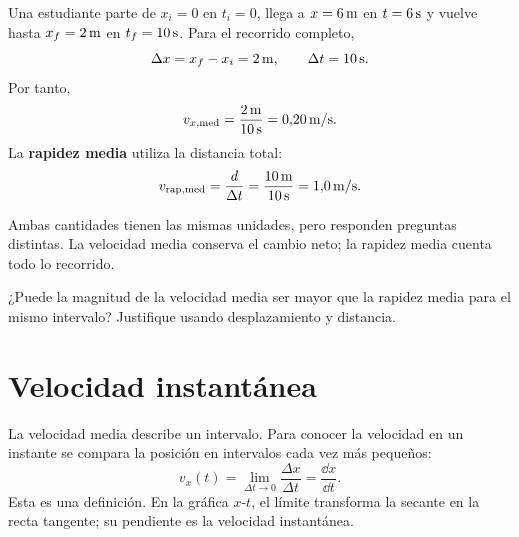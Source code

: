 \documentclass[11pt]{article}
\begin{document}
Una estudiante parte de \(x_i=0\) en \(t_i=0\), llega a
\(x=6\,\mathrm{m}\) en \(t=6\,\mathrm{s}\) y vuelve hasta
\(x_f=2\,\mathrm{m}\) en \(t_f=10\,\mathrm{s}\). Para el recorrido completo,
\[
  \Delta x=x_f-x_i=2\,\mathrm{m},
  \qquad
  \Delta t=10\,\mathrm{s}.
\]
Por tanto,
\[
  v_{x,\mathrm{med}}
  =
  \frac{2\,\mathrm{m}}{10\,\mathrm{s}}
  =
  0{,}20\,\mathrm{m/s}.
\]
La \textbf{rapidez media} utiliza la distancia total:
\[
  v_{\mathrm{rap,med}}
  =
  \frac{d}{\Delta t}
  =
  \frac{10\,\mathrm{m}}{10\,\mathrm{s}}
  =
  1{,}0\,\mathrm{m/s}.
\]


Ambas cantidades tienen las mismas unidades, pero responden preguntas
distintas. La velocidad media conserva el cambio neto; la rapidez media cuenta
todo lo recorrido.

\begin{pregunta}
¿Puede la magnitud de la velocidad media ser mayor que la rapidez media para el
mismo intervalo? Justifique usando desplazamiento y distancia.
\end{pregunta}

\section{Velocidad instantánea}

La velocidad media describe un intervalo. Para conocer la velocidad en un
instante se compara la posición en intervalos cada vez más pequeños:
\[
  v_x(t)
  =
  \lim_{\Delta t\to0}
  \frac{\Delta x}{\Delta t}
  =
  \frac{\dd x}{\dd t}.
\]
Esta es una definición. En la gráfica \(x\)-\(t\), el límite transforma la
secante en la recta tangente; su pendiente es la velocidad instantánea.

\begin{center}
\end{center}
\end{document}
